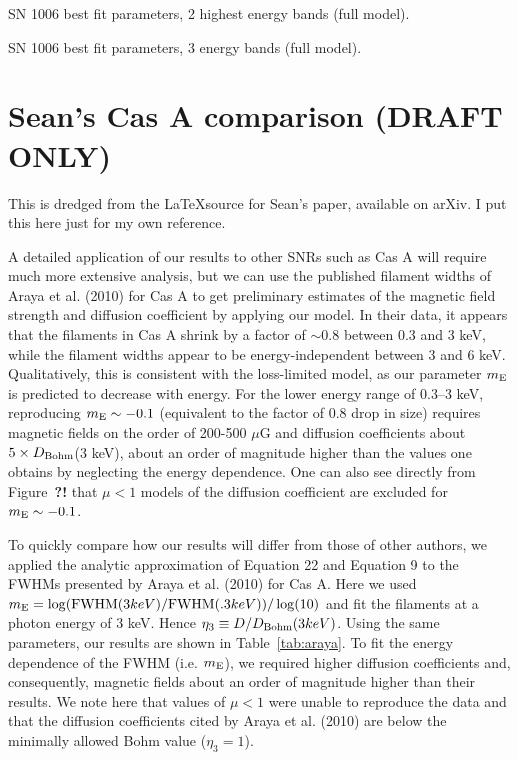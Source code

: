 \documentclass[12pt,preprint]{aastex}  %
\begin{document}
\begin{table*}[h]
\scriptsize
\centering
\caption{SN 1006 best fit parameters, 2 highest energy bands (full model).
\label{tab:sn1006-2band}}

\end{table*}

\begin{table*}[h]
\scriptsize
\centering
\caption{SN 1006 best fit parameters, 3 energy bands (full model).
\label{tab:sn1006-3band}}

\end{table*}


\section{Sean's Cas A comparison (DRAFT ONLY)}

This is dredged from the \LaTeX source for Sean's paper, available on arXiv.
I put this here just for my own reference.

A detailed application of our results to other SNRs such as Cas A will
require much more extensive analysis, but we can use the published
filament widths of Araya et al. (2010) for Cas A to get preliminary
estimates of the magnetic field strength and diffusion coefficient by
applying our model. In their data, it appears that the filaments in
Cas A shrink by a factor of $\sim 0.8$ between 0.3 and 3 keV, while the
filament widths appear to be energy-independent between 3 and 6 keV.
Qualitatively, this is consistent with the loss-limited model, as our
parameter $m_{\rm E}$ is predicted to decrease with energy.  For the
lower energy range of 0.3--3 keV, reproducing $m_{\rm E}\sim -0.1$
(equivalent to the factor of 0.8 drop in size) requires magnetic
fields on the order of 200-500 $\mu$G and diffusion coefficients about
$5 \times D_{\rm Bohm}$(3 keV), about an order of magnitude higher
than the values one obtains by neglecting the energy dependence. One
can also see directly from Figure~\textbf{?!} that $\mu < 1$ models
of the diffusion coefficient are excluded for $m_{\rm E}\sim -0.1$.

To quickly compare how our results will differ from those of other authors, we
applied the analytic approximation of Equation 22 and Equation 9 to the FWHMs
presented by Araya et al. (2010) for Cas A. Here we used $m_{\rm E} = \log(
{\rm FWHM}(3keV)/{\rm FWHM}(.3keV))/\log(10)$ and fit the filaments at a photon
energy of 3 keV.  Hence $\eta_3 \equiv D/D_{\rm Bohm}(3 keV)$. Using the same
parameters, our results are shown in Table~\ref{tab:araya}. To fit the energy
dependence of the FWHM (i.e. $m_{\rm E}$), we required higher diffusion
coefficients and, consequently, magnetic fields about an order of magnitude
higher than their results. We note here that values of $\mu<1$ were unable to
reproduce the data and that the diffusion coefficients cited by Araya et al.
(2010) are below the minimally allowed Bohm value ($\eta_3 = 1$).
\end{document}
